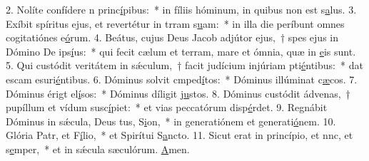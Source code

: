 2. Nolíte confídere n princ\uline{í}pibus:~* in fíliis hóminum, in quibus non est s\uline{a}lus.
3. Exíbit spíritus ejus, et revertétur in trram s\uline{u}am:~* in illa die períbunt omnes cogitatiónes e\uline{ó}rum.
4. Beátus, cujus Deus Jacob adjútor ejus,~† spes ejus in Dómino De ips\uline{í}us:~* qui fecit cælum et terram, mare et ómnia, quæ in \uline{e}is sunt.
5. Qui custódit veritátem in sǽculum,~† facit judícium injúriam pti\uline{é}ntibus:~* dat escam esuri\uline{é}ntibus.
6. Dóminus solvit cmped\uline{í}tos:~* Dóminus illúminat c\uline{æ}cos.
7. Dóminus érigt el\uline{í}sos:~* Dóminus díligit j\uline{u}stos.
8. Dóminus custódit ádvenas,~† pupíllum et vídum susc\uline{í}piet:~* et vias peccatórum disp\uline{é}rdet.
9. Regnábit Dóminus in sǽcula, Deus tus, S\uline{i}on,~* in generatiónem et generati\uline{ó}nem.
10. Glória Patr, et F\uline{í}lio,~* et Spirítui S\uline{a}ncto.
11. Sicut erat in princípio, et nnc, et s\uline{e}mper,~* et in sǽcula sæculórum. \uline{A}men.
